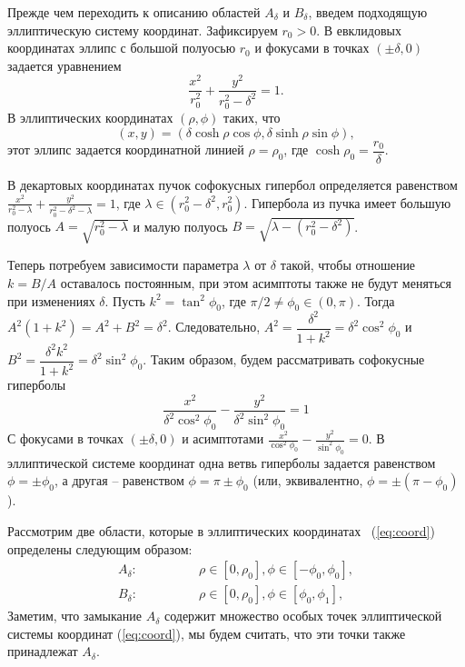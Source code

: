 Прежде чем переходить к описанию областей $A_\delta$ и  $B_\delta$, введем подходящую эллиптическую систему координат.
Зафиксируем $r_0>0$. 
В евклидовых координатах эллипс с большой полуосью  $r_0$ и фокусами в точках $(\pm \delta, 0)$ задается уравнением
$$
\frac{x^2}{r_0^2} + \frac{y^2}{r_0^2 -\delta^2}=1.
$$
В эллиптических координатах
$(\rho,\phi)$ таких, что
\begin{equation}
\label{eq:coord}
(x, y) = (\delta \cosh \rho \cos \phi , \delta \sinh \rho \sin \phi),
\end{equation}
этот эллипс задается координатной линией $\rho=\rho_0$,
где $\cosh \rho_0 = \dfrac{r_0}{\delta}$.

В декартовых координатах пучок софокусных гипербол определяется равенством
$\frac{x^2}{r_0^2 - \lambda} + \frac{y^2}{r_0^2 - \delta^2 - \lambda} = 1$, где $\lambda\in (r_0^2 - \delta^2, r_0^2)$.
Гипербола из пучка имеет большую полуось
 $A=\sqrt{r_0^2 - \lambda}$
и малую полуось $ B=\sqrt{\lambda - (r_0^2 - \delta^2)}$.
 
Теперь потребуем зависимости параметра $\lambda $ от  $\delta$ такой, чтобы отношение $k=B/A$ оставалось постоянным, при этом асимптоты также не будут меняться при изменениях $\delta$. Пусть $k^2 = \tan ^2 \phi_0$, где $\pi/2\ne \phi_0\in (0,\pi) $.
 Тогда $A^2(1+k^2) = A^2+B^2 = \delta^2.$
 Следовательно, $A^2=\dfrac{\delta^2}{1+k^2} = \delta^2\cos^2\phi_0$ и
 $B^2=\dfrac{\delta^2k^2}{1+k^2} = \delta^2\sin^2\phi_0$.
 Таким образом, будем рассматривать софокусные гиперболы
 \begin{equation}\label{eq:hyper}
 \frac{x^2}{\delta^2\cos^2\phi_0}  -  \frac{y^2}{\delta^2\sin^2\phi_0}  =1
 \end{equation}
С фокусами в точках $(\pm \delta, 0)$ и асимптотами
 $
  \frac{x^2}{\cos^2\phi_0}  -  \frac{y^2}{\sin^2\phi_0}  =0.
 $
В эллиптической системе координат одна ветвь гиперболы задается равенством $\phi = \pm\phi_0$, а другая -- равенством $\phi =\pi\pm\phi_0$ (или, эквивалентно, $\phi =\pm(\pi-\phi_0)$).
 
Рассмотрим две области, которые в эллиптических координатах ~(\ref{eq:coord})
определены следующим образом:
$$
\begin{aligned}
 A_\delta:&\qquad\qquad \rho \in [0, \rho_0], \phi \in [-\phi_0, \phi_0 ],\\
  B_\delta:&\qquad\qquad  \rho \in [0, \rho_0], \phi \in [\phi_0, \phi_1 ], 
\end{aligned}
$$
Заметим, что замыкание  $A_\delta$ содержит множество особых точек эллиптической системы координат (\ref{eq:coord}), мы будем считать, что эти точки также принадлежат $A_\delta$.

